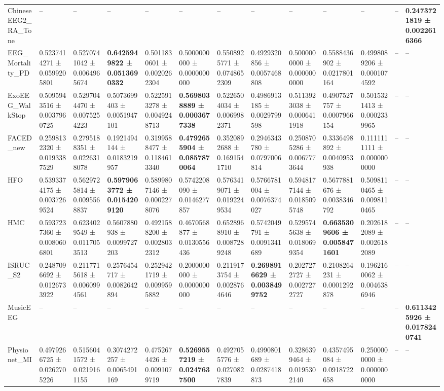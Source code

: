 \begin{table}[htbp]
\begin{tabular}{lllllllllllll}
ChineseEEG2_RA_Tone & -- & -- & -- & -- & -- & -- & -- & -- & -- & -- & -- & \bfseries 0.2473721819 ± 0.0022616366 \\
EEG_Mortality_PD & 0.5237414271 ± 0.0599205801 & 0.5270741042 ± 0.0064965674 & \bfseries 0.6425949822 ± 0.0513690332 & 0.5011830601 ± 0.0020262304 & 0.5000000000 ± 0.0000000000 & 0.5508925771 ± 0.0748652309 & 0.4929320856 ± 0.0057468808 & 0.5000000000 ± 0.0000000000 & 0.5588436902 ± 0.0217801164 & 0.4998089206 ± 0.0001074592 & -- & -- \\
ExoEEG_WalkStop & 0.5095943516 ± 0.0037960725 & 0.5297044470 ± 0.0075254223 & 0.5073699403 ± 0.0051947101 & 0.5225913278 ± 0.0049248713 & \bfseries 0.5698038889 ± 0.0003677338 & 0.5226504034 ± 0.0069982371 & 0.4986913185 ± 0.0029799598 & 0.5113923038 ± 0.0006411918 & 0.4907527757 ± 0.0007966154 & 0.5015321413 ± 0.0002339965 & -- & -- \\
FACED_new & 0.2598132320 ± 0.0193387529 & 0.2795188351 ± 0.0226318078 & 0.1921494144 ± 0.0183219957 & 0.3199588477 ± 0.1184613340 & \bfseries 0.4792655904 ± 0.0857870064 & 0.3520892688 ± 0.1691541710 & 0.2946343780 ± 0.0797006814 & 0.2508705286 ± 0.0067773644 & 0.3336498892 ± 0.0040953938 & 0.1111111111 ± 0.0000000000 & -- & -- \\
HFO & 0.5393374175 ± 0.0037269524 & 0.5629725814 ± 0.0095568837 & \bfseries 0.5979063772 ± 0.0154209120 & 0.5899807146 ± 0.0002278076 & 0.5742208090 ± 0.0146277857 & 0.5763419071 ± 0.0192249534 & 0.5766781004 ± 0.0076374027 & 0.5948177144 ± 0.0185095748 & 0.5677881676 ± 0.0038346792 & 0.5098110465 ± 0.0098110465 & -- & -- \\
HMC & 0.5937237360 ± 0.0080606801 & 0.6234029549 ± 0.0117053513 & 0.5607880938 ± 0.0099727203 & 0.4921588200 ± 0.0028032312 & 0.4670568877 ± 0.0130556436 & 0.6528968910 ± 0.0087289248 & 0.5742049791 ± 0.0091341689 & 0.5295745638 ± 0.0180699354 & \bfseries 0.6635309606 ± 0.0058471601 & 0.2026182089 ± 0.0026182089 & -- & -- \\
ISRUC_S2 & 0.2487096692 ± 0.0126733922 & 0.2117715618 ± 0.0060994561 & 0.2576454717 ± 0.0082642894 & 0.2529421719 ± 0.0099595882 & 0.2000000000 ± 0.0000000000 & 0.2119173754 ± 0.0028764646 & \bfseries 0.2698916629 ± 0.0038499752 & 0.2027272727 ± 0.0027272727 & 0.2108264231 ± 0.0001292878 & 0.1962160062 ± 0.0046386946 & -- & -- \\
MusicEEG & -- & -- & -- & -- & -- & -- & -- & -- & -- & -- & -- & \bfseries 0.6113425926 ± 0.0178240741 \\
Physionet_MI & 0.4979266725 ± 0.0262705226 & 0.5156041572 ± 0.0219161155 & 0.3074272257 ± 0.0065491169 & 0.4752674426 ± 0.0091079719 & \bfseries 0.5269557219 ± 0.0247637500 & 0.4927055776 ± 0.0270827839 & 0.4990801689 ± 0.0287418873 & 0.3286399464 ± 0.0195302140 & 0.4357495084 ± 0.0918722658 & 0.2500000000 ± 0.0000000000 & -- & -- \\

\end{tabular}
\end{table}
